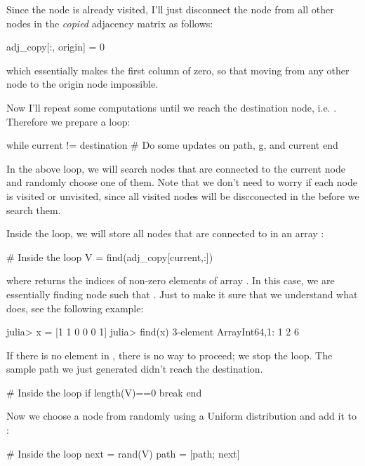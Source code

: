 Since the  node is already visited, I'll just disconnect the node from all other nodes in the \emph{copied} adjacency matrix  as follows:
\begin{code}
adj_copy[:, origin] = 0
\end{code}
\noindent which essentially makes the first column of  zero, so that moving from any other node to the origin node impossible.

Now I'll repeat some computations until we reach the destination node, i.e. . Therefore we prepare a  loop:
\begin{code}
while current != destination
    # Do some updates on path, g, and current
end
\end{code}
\noindent In the above loop, we will search nodes that are connected to the current node and randomly choose one of them. Note that we don't need to worry if each node is visited or unvisited, since all visited nodes will be discconected in the  before we search them.

Inside the loop, we will store all nodes that are connected to  in an array :
\begin{code}
# Inside the loop
V = find(adj_copy[current,:])
\end{code}
\noindent where  returns the indices of non-zero elements of array . In this case, we are essentially finding node  such that . Just to make it sure that we understand what  does, see the following example:
\begin{code}
julia> x = [1 1 0 0 0 1]
julia> find(x)
3-element Array{Int64,1}:
 1
 2
 6
\end{code}

If there is no element in , there is no way to proceed; we stop the loop. The sample path we just generated didn't reach the destination.
\begin{code}
# Inside the loop
if length(V)==0
    break
end
\end{code}

Now we choose a node from  randomly using a Uniform distribution and add it to :
\begin{code}
# Inside the loop
next = rand(V)
path = [path; next]
\end{code}

